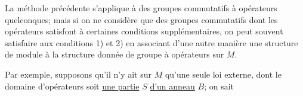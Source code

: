 La méthode précédente s'applique à des groupes commutatifs à opérateurs quelconques; mais si on ne considère que des groupes commutatifs dont les opérateurs satisfont à certaines conditions supplémentaires, on peut souvent satisfaire aux conditions 1) et 2) en associant d'une autre manière une structure de module à la structure donnée de groupe à opérateurs sur $M$.

Par exemple, supposons qu'il n'y ait sur $M$ qu'une seule loi externe, dont le domaine d'opérateurs soit \uline{une partie} $S$ \uline{d'un anneau} $B$; on sait
